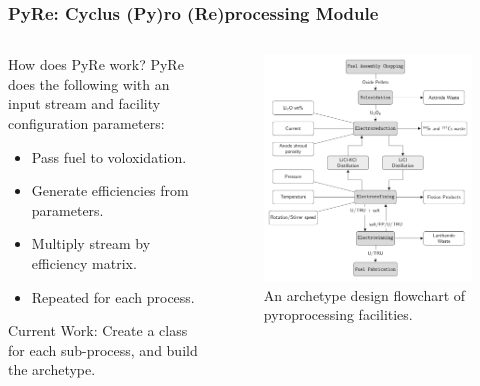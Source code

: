 \begin{frame}
\frametitle{PyRe: Cyclus (Py)ro (Re)processing Module}
\begin{columns}
	\begin{column}{.45\textwidth}
		\begin{block}{How does PyRe work?} 
			PyRe does the following with an input stream and facility configuration parameters: 
			\begin{itemize}
				\item Pass fuel to voloxidation.
				\item Generate efficiencies from parameters.
				\item Multiply stream by efficiency matrix.
				\item Repeated for each process.
			\end{itemize}
		\end{block}
		\begin{block}{Current Work:} 
		Create a class for each sub-process, and build the archetype. 
		\end{block}
	\end{column}
	\begin{column}{.55\textwidth}
		\begin{figure}
			\centering
			\includegraphics[width=0.9\linewidth]{flowchart}
			\caption{An archetype design flowchart of pyroprocessing facilities.}
			\label{fig:pyre}
		\end{figure}
	\end{column}
\end{columns} 
\end{frame}

